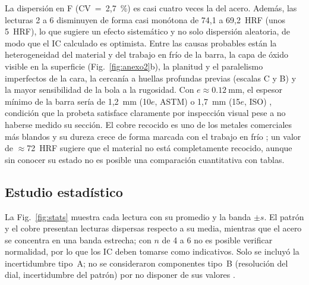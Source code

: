 \documentclass[journal,11pt]{IEEEtran}
\begin{document}
La dispersión en F (CV~=~2,7~\%) es casi cuatro veces la del acero. Además, las lecturas 2 a 6 disminuyen de forma casi monótona de 74,1 a 69,2~HRF (unos 5~HRF), lo que sugiere un efecto sistemático y no solo dispersión aleatoria, de modo que el IC calculado es optimista. Entre las causas probables están la heterogeneidad del material y del trabajo en frío de la barra, la capa de óxido visible en la superficie (Fig.~\ref{fig:anexo2}b), la planitud y el paralelismo imperfectos de la cara, la cercanía a huellas profundas previas (escalas C y B) y la mayor sensibilidad de la bola a la rugosidad. Con $e\approx\SI{0,12}{\milli\metre}$, el espesor mínimo de la barra sería de 1,2~mm (10$e$, ASTM) o 1,7~mm (15$e$, ISO) \cite{astm18,iso6508}, condición que la probeta satisface claramente por inspección visual pese a no haberse medido su sección. El cobre recocido es uno de los metales comerciales más blandos y su dureza crece de forma marcada con el trabajo en frío \cite{callister}; un valor de $\approx$72~HRF sugiere que el material no está completamente recocido, aunque sin conocer su estado no es posible una comparación cuantitativa con tablas.

\subsection{Estudio estadístico}
La Fig.~\ref{fig:stats} muestra cada lectura con su promedio y la banda $\pm s$. El patrón y el cobre presentan lecturas dispersas respecto a su media, mientras que el acero se concentra en una banda estrecha; con $n$ de 4 a 6 no es posible verificar normalidad, por lo que los IC deben tomarse como indicativos. Solo se incluyó la incertidumbre tipo~A; no se consideraron componentes tipo~B (resolución del dial, incertidumbre del patrón) por no disponer de sus valores \cite{gum}.
\end{document}
